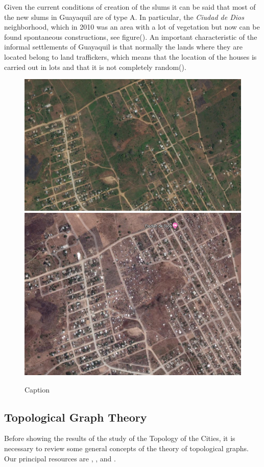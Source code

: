 \documentclass[10pt]{article}
\begin{document}
Given the current conditions of creation of the slums it can be said that most of the new slums in Guayaquil are of type A. In particular, the \emph{Ciudad de Dios} neighborhood, which in 2010 was an area with a lot of vegetation but now can be found spontaneous constructions, see figure(). An important characteristic of the informal settlements of Guayaquil is that normally the lands where they are located belong to land traffickers, which means that the location of the houses is carried out in lots and that it is not completely random().

\begin{figure}[h]
    \centering
    \includegraphics[scale = 0.31]{images/slum2010}
    \includegraphics[scale = 0.22]{images/slum2019}
    \caption{Caption}
    \label{fig:my_label}
\end{figure}
\subsection{Topological Graph Theory}
Before showing the results of the study of the Topology of the Cities, it is necessary to review some general concepts of the theory of topological graphs. Our principal resources are \cite{gross2009topics}, \cite{bonnington2012foundations}, \cite{gross1987topological} and \cite{richeson2008euler}.\\
\end{document}
